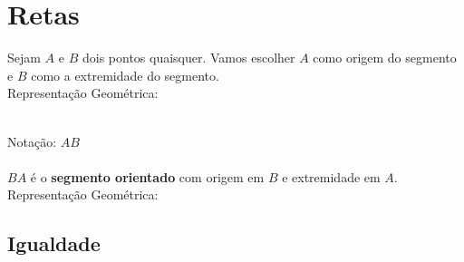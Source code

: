 \documentclass[ ]{article}
\begin{document}
	\section{Retas}
		Sejam $A$ e $B$ dois pontos quaisquer. Vamos escolher $A$ como origem do segmento e $B$ como a extremidade do segmento.\\
		Representação Geométrica:
		\\
		Notação: $AB$\\ \\
		$BA$ é o \textbf{segmento orientado} com origem em $B$ e extremidade em $A$.\\
		Representação Geométrica:
		\subsection{Igualdade}
\end{document}
